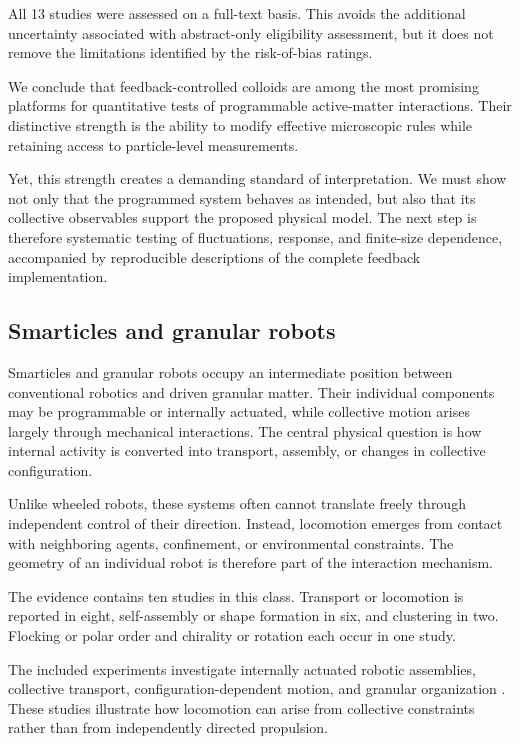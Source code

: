 All 13 studies were assessed on
a full-text basis. This avoids the
additional uncertainty associated
with abstract-only eligibility
assessment, but it does not remove
the limitations identified by the
risk-of-bias ratings.

We conclude that feedback-controlled
colloids are among the most promising
platforms for quantitative tests of
programmable active-matter interactions.
Their distinctive strength is the
ability to modify effective microscopic
rules while retaining access to
particle-level measurements.

Yet, this strength creates a demanding
standard of interpretation. We must
show not only that the programmed
system behaves as intended, but also
that its collective observables
support the proposed physical model.
The next step is therefore systematic
testing of fluctuations, response,
and finite-size dependence, accompanied
by reproducible descriptions of the
complete feedback implementation.

\subsection{Smarticles and granular robots}
\label{sec:platforms-smarticles}

Smarticles and granular robots occupy an intermediate
position between conventional robotics and driven
granular matter. Their individual components may be
programmable or internally actuated, while collective
motion arises largely through mechanical interactions.
The central physical question is how internal activity
is converted into transport, assembly, or changes in
collective configuration.

Unlike wheeled robots, these systems often cannot
translate freely through independent control of
their direction. Instead, locomotion emerges from
contact with neighboring agents, confinement,
or environmental constraints. The geometry of
an individual robot is therefore part of the
interaction mechanism.

The evidence contains ten studies in this class.
Transport or locomotion is reported in eight,
self-assembly or shape formation in six,
and clustering in two. Flocking or polar
order and chirality or rotation each occur
in one study.

The included experiments investigate internally
actuated robotic assemblies, collective transport,
configuration-dependent motion, and granular
organization
\cite{Li2018supersmarticlealo,Bhamla2021collectivetransport,Vardhan2022glidersinshapecha,Savoie2018phototacticsupersma,OzkanAydin2020collectiveprotectio,Luo2025flockingphasesepar,Warkentin2018locomotingrobotsco,Chvykov2020lowrattlingapred,Savoie2019arobotmadeofrobo,Li2020programmingactiveg}.
These studies illustrate how locomotion can
arise from collective constraints rather
than from independently directed propulsion.


